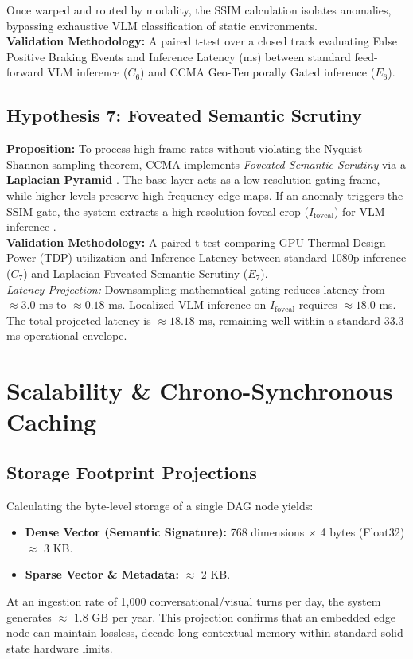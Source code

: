 \documentclass[11pt, a4paper]{article}
\begin{document}
	Once warped and routed by modality, the SSIM calculation isolates anomalies, bypassing exhaustive VLM classification of static environments.\\
	\textbf{Validation Methodology:} A paired t-test over a closed track evaluating False Positive Braking Events and Inference Latency (ms) between standard feed-forward VLM inference ($C_6$) and CCMA Geo-Temporally Gated inference ($E_6$).
	
	\subsection{Hypothesis 7: Foveated Semantic Scrutiny}
	\textbf{Proposition:} To process high frame rates without violating the Nyquist-Shannon sampling theorem, CCMA implements \textit{Foveated Semantic Scrutiny} via a \textbf{Laplacian Pyramid} \cite{burt1983laplacian}. The base layer acts as a low-resolution gating frame, while higher levels preserve high-frequency edge maps. If an anomaly triggers the SSIM gate, the system extracts a high-resolution foveal crop ($I_{\text{foveal}}$) for VLM inference \cite{mnih2014recurrent}.\\
	\textbf{Validation Methodology:} A paired t-test comparing GPU Thermal Design Power (TDP) utilization and Inference Latency between standard 1080p inference ($C_7$) and Laplacian Foveated Semantic Scrutiny ($E_7$).\\
	\textit{Latency Projection:} Downsampling mathematical gating reduces latency from $\approx 3.0$ ms to $\approx 0.18$ ms. Localized VLM inference on $I_{\text{foveal}}$ requires $\approx 18.0$ ms. The total projected latency is $\approx 18.18$ ms, remaining well within a standard 33.3 ms operational envelope.
	
	\section{Scalability \& Chrono-Synchronous Caching}
	
	\subsection{Storage Footprint Projections}
	Calculating the byte-level storage of a single DAG node yields:
	\begin{itemize}
		\item \textbf{Dense Vector (Semantic Signature):} 768 dimensions $\times$ 4 bytes (Float32) $\approx$ 3 KB.
		\item \textbf{Sparse Vector \& Metadata:} $\approx$ 2 KB.
	\end{itemize}
	At an ingestion rate of 1,000 conversational/visual turns per day, the system generates $\approx$ 1.8 GB per year. This projection confirms that an embedded edge node can maintain lossless, decade-long contextual memory within standard solid-state hardware limits.
	
\end{document}
